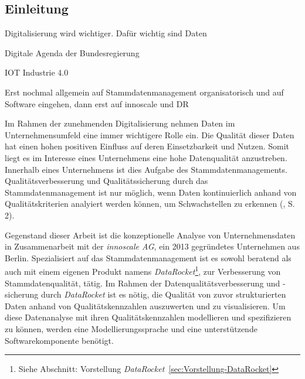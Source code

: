 \documentclass[
  language=german, %
  type=bachelor,%
  ngerman
]{isthesis}
\begin{document}
\begin{content}



  \chapter{Einleitung}


  Digitalisierung wird wichtiger. Dafür wichtig sind Daten

  Digitale Agenda der Bundesregierung

  IOT Industrie 4.0

  Erst nochmal allgemein auf Stammdatenmanagement organisatorisch und auf Software eingehen, dann erst auf innoscale und DR

  Im Rahmen der zunehmenden Digitalisierung nehmen Daten im Unternehmensumfeld  eine immer
  wichtigere Rolle ein. Die Qualität dieser Daten hat einen hohen positiven
  Einfluss auf deren Einsetzbarkeit und Nutzen. Somit liegt es im Interesse
  eines Unternehmens eine hohe Datenqualität anzustreben. Innerhalb eines
  Unternehmens ist dies Aufgabe des Stammdatenmanagements.
  Qualitätsverbesserung und Qualitätssicherung durch das Stammdatenmanagement
  ist nur möglich, wenn Daten kontinuierlich anhand von Qualitätskriterien
  analyiert werden können, um Schwachstellen zu erkennen
  (\cite{baghi2013controlling}, S. 2).

  Gegenstand dieser Arbeit ist die konzeptionelle Analyse von Unternehmensdaten
  in Zusammenarbeit mit der \textit{innoscale AG}, ein 2013 gegründetes
  Unternehmen aus Berlin.  Spezialisiert auf das Stammdatenmanagement ist es
  sowohl beratend als auch mit einem eigenen Produkt namens
  \textit{DataRocket}\footnote{Siehe Abschnitt: Vorstellung
  \textit{DataRocket}~\ref{sec:Vorstellung-DataRocket}}, zur Verbesserung von
  Stammdatenqualität, tätig. Im Rahmen der Datenqualitätsverbesserung und
  -sicherung durch \textit{DataRocket} ist es nötig, die Qualität von zuvor
  strukturierten Daten anhand von Qualitätskennzahlen auszuwerten und zu
  visualisieren. Um diese Datenanalyse mit ihren Qualitätskennzahlen
  modellieren und spezifizieren zu können, werden eine Modellierungssprache und
  eine unterstützende Softwarekomponente benötigt.


\end{content}
\end{document}
